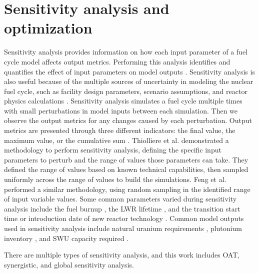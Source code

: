 \section{Sensitivity analysis and optimization}
Sensitivity analysis provides information on how each input parameter 
of a fuel cycle model affects output metrics. 
Performing this analysis identifies and quantifies the effect of input 
parameters on model outputs \cite{thiolliere_methodology_2018}. Sensitivity 
analysis is also useful because of the multiple sources of uncertainty in 
modeling the nuclear fuel cycle, such as facility design parameters, 
scenario assumptions, and reactor physics calculations 
\cite{noauthor_effects_2017}.
Sensitivity 
analysis simulates a fuel cycle multiple times 
with small perturbations in model inputs between each simulation. Then 
we observe the output metrics for any changes caused by each  
perturbation. Output metrics are presented through three different 
indicators: the final value, the maximum value, or the cumulative sum 
\cite{noauthor_effects_2017}. Thiolliere et al. 
\cite{thiolliere_methodology_2018} demonstrated a methodology to 
perform sensitivity analysis, defining the specific input parameters to 
perturb and the range of values those parameters can take.
They defined the range of values based on known technical capabilities, then 
sampled uniformly across the range of values to build the simulations. 
Feng et al. \cite{feng_sensitivity_2020} performed a similar methodology, 
using random sampling in the identified range of input variable values.
Some common
parameters varied during sensitivity analysis include the fuel burnup 
\cite{thiolliere_methodology_2018,noauthor_effects_2017}, the \gls{LWR}
lifetime \cite{feng_sensitivity_2020,noauthor_effects_2017}, 
and the transition start time or introduction date of new reactor technology
\cite{chee_sensitivity_2019,passerini_systematic_2014,noauthor_effects_2017}. 
Common model outputs used in sensitivity analysis include 
natural uranium requirements \cite{noauthor_effects_2017,richards_application_2021},
plutonium inventory \cite{chee_sensitivity_2019,noauthor_effects_2017}, 
and \gls{SWU} 
capacity required \cite{noauthor_effects_2017,richards_application_2021}.

There are multiple types of sensitivity analysis, and this work includes 
\gls{OAT}, synergistic, and global sensitivity analysis. 

